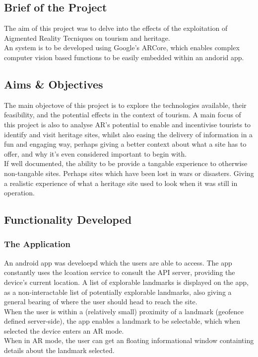\subsection{Brief of the Project}
The aim of this project was to delve into the effects of the exploitation of Aigmented Reality Tecniques on tourism and heritage.\\
An system is to be developed using Google's ARCore, which enables complex computer vision based functions to be easily embedded within an andorid app. 
\subsection{Aims \& Objectives}
The main objectove of this project is to explore the technologies available, their feasibility, and the potential effects in the context of tourism. 
A main focus of this project is also to analyse AR's potential to enable and incentivise tourists to identify and visit heritage sites, 
whilst also easing the delivery of information in a fun and engaging way, perhaps
giving a better context about what a site has to offer, and why it's even considered important to begin with.\\
If well documented, the ability to be provide a tangable experience to otherwise non-tangable sites. Perhaps sites which have been
lost in wars or disasters. Giving a realistic experience of what a heritage site used to look when it was still in operation. 

\subsection{Functionality Developed}
\subsubsection{The Application}
An android app was develoepd which the users are able to access. The app constantly uses the lcoation service to consult the API server, providing the device's current
 location. A list of explorable landmarks is displayed on the app, as a non-interactable list of potentially explorable landmarks, also giving a general bearing of where the 
 user should head to reach the site.\\
 When the user is within a (relatively small) proximity of a landmark (geofence defined server-side), the app enables a landmark to be selectable, which when selected the device enters an AR mode.\\
 When in AR mode, the user can get an floating informational window containting details about the landmark selected.
